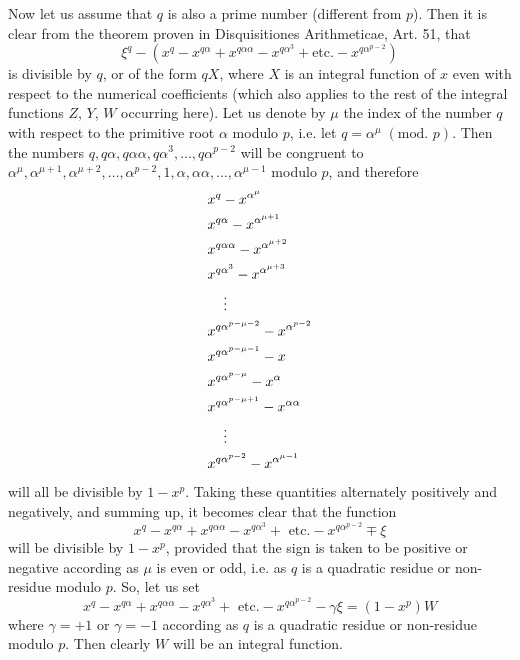 \documentclass{book}
\theoremstyle{plain}
\theoremstyle{remark}
\begin{document}
Now let us assume that $q$ is also a prime number (different from $p$).  Then it is clear from the theorem proven in Disquisitiones Arithmeticae, Art. 51, that 
\[ \xi^q - (x^q -x^{q\alpha} +x^{q\alpha\alpha} - x^{q\alpha^3} +\textrm{etc.} - x^{q\alpha^{p-2}}) \]
is divisible by $q$, or of the form $qX$, where $X$ is an integral function of $x$ even with respect to the numerical coefficients (which also applies to the rest of the integral functions $Z$, $Y$, $W$ occurring here).  Let us denote by $\mu$ the index of the number $q$ with respect to the primitive root $\alpha$ modulo $p$, i.e. let $q = \alpha^{\mu} \; (\textrm{mod. } p)$.   Then the numbers $q, q\alpha, q\alpha\alpha, q\alpha^3, \dots, q\alpha^{p-2}$ will be congruent to $\alpha^{\mu}, \alpha^{\mu+1},\alpha^{\mu+2},\dots,\alpha^{p-2},1,\alpha,\alpha\alpha,\dots,\alpha^{\mu-1}$ modulo $p$, and therefore
\begin{align*}
 &x^q - x^{\alpha^{\mu}} \\
 &x^{q\alpha} - x^{\alpha^{\mu+1}} \\
 &x^{q\alpha\alpha} - x^{\alpha^{\mu+2}} \\
 &x^{q\alpha^3} - x^{\alpha^{\mu+3}} \\
  & \hspace{4mm} \vdots \\
 & x^{q\alpha^{p-\mu-2}} - x^{\alpha^{p-2}} \\
 & x^{q\alpha^{p-\mu-1}} - x \\
  & x^{q\alpha^{p-\mu}} - x^{\alpha} \\
   & x^{q\alpha^{p-\mu+1}} - x^{\alpha\alpha} \\
  & \hspace{4mm} \vdots \\
 & x^{q\alpha^{p-2}} - x^{\alpha^{\mu-1}} \\
     \end{align*}
 will all be divisible by $1-x^p$.  Taking these quantities alternately positively and negatively, and summing up, it becomes clear that the function 
\[ x^q - x^{q\alpha}+x^{q\alpha\alpha}-x^{q\alpha^3} + \textrm{ etc.} - x^{q\alpha^{p-2}} \mp \xi \]
will be divisible by $1-x^p$, provided that the sign is taken to be positive or negative according as $\mu$ is even or odd, i.e. as $q$ is a quadratic residue or non-residue modulo $p$.   So, let us set
\[ x^q - x^{q\alpha}+x^{q\alpha\alpha} - x^{q\alpha^3}  + \textrm{ etc.} - x^{q\alpha^{p-2}} - \gamma \xi = (1-x^p)W \]
where $\gamma=+1$ or $\gamma = -1$ according as $q$ is a quadratic residue or non-residue modulo $p$.  Then clearly $W$ will be an integral function.  
\end{document}
